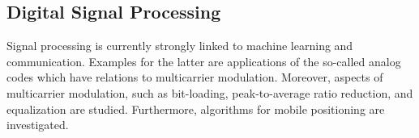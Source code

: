 \subsection{Digital Signal Processing}


Signal processing is currently strongly linked to machine learning
and communication. Examples for the latter are applications of the
so-called analog codes which have relations to multicarrier
modulation. Moreover, aspects of multicarrier modulation, such as
bit-loading, peak-to-average ratio reduction, and equalization are
studied. Furthermore, algorithms for mobile positioning are
investigated.


